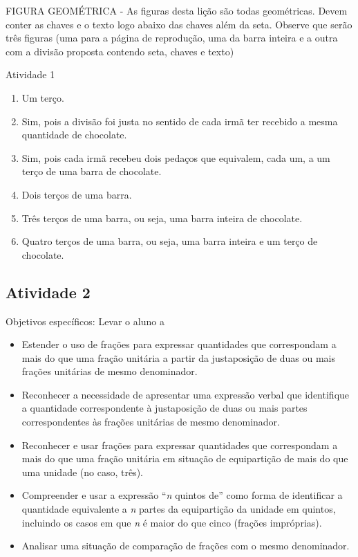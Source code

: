 \documentclass[oneside]{book}
\begin{document}
\begin{multicols}{2}
  \begin{imagem*}[breakable]{}{}     FIGURA GEOMÉTRICA - As figuras desta lição são todas geométricas. Devem conter as chaves e o texto logo abaixo das chaves além da seta. Observe que serão três figuras (uma para a página de reprodução, uma da barra inteira e a outra com a divisão proposta contendo seta, chaves e texto)
  \end{imagem*}

\begin{resposta*}{Atividade 1}
\begin{enumerate} [\quad I)] %
    \item       Um terço.
    \item       Sim, pois a divisão foi justa no sentido de cada irmã ter recebido a mesma quantidade de chocolate.
    \item       Sim, pois cada irmã recebeu dois pedaços que equivalem, cada um, a um terço de uma barra de chocolate.
    \item       Dois terços de uma barra.
    \item       Três terços de uma barra, ou seja, uma barra inteira de chocolate.
    \item       Quatro terços de uma barra, ou seja, uma barra inteira e um terço de chocolate.
\end{enumerate} %

\end{resposta*}






\subsection{Atividade 2}




  Objetivos específicos: Levar o aluno a
\begin{itemize} %
    \item       Estender o uso de frações para expressar quantidades que correspondam a mais do que uma fração unitária  a partir da justaposição de duas ou mais frações unitárias de mesmo denominador.
    \item       Reconhecer a necessidade de apresentar uma expressão verbal que identifique a quantidade correspondente à justaposição de duas ou mais partes correspondentes às frações unitárias de mesmo denominador.
    \item       Reconhecer e usar frações para expressar quantidades que correspondam a mais do que uma fração unitária em situação de equipartição de mais do que uma unidade (no caso, três).
    \item       Compreender e usar a expressão       ``{\it n} quintos de''       como forma de identificar a quantidade equivalente a       {\it n}       partes da equipartição da unidade em quintos, incluindo os casos em que       {\it n}       é maior do que cinco (frações impróprias).
    \item       Analisar uma situação de comparação de frações com o mesmo denominador.
\end{itemize} %



\end{multicols}
\end{document}
